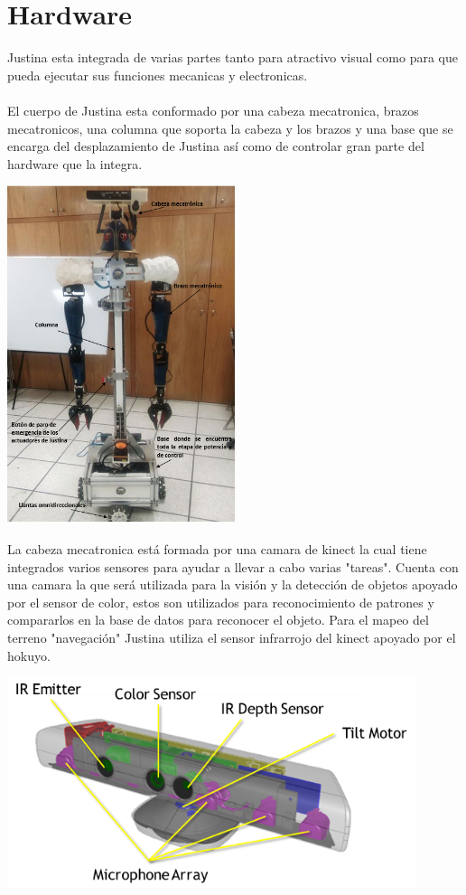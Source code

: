 \documentclass[a4paper,usenames,dvipsnames,svgnames,table]{book}
\begin{document}
\chapter{Hardware}
Justina esta integrada de varias partes tanto para atractivo visual como para que pueda ejecutar sus funciones mecanicas y 
electronicas.\\
\\
El cuerpo de Justina esta conformado por una cabeza mecatronica, brazos mecatronicos, una columna que soporta la cabeza y 
los brazos y una base que se encarga del desplazamiento de Justina así como de controlar gran parte del hardware que la 
integra.


\begin{center}
\includegraphics[width=0.5\textwidth]{Figures/Hardware/Diagramas/Cuerpo.png}
\label{fig:Hardware:Diagramas:Justina:Completa}
\end{center}
 
 La cabeza mecatronica está formada por una camara de kinect la cual tiene integrados varios sensores para ayudar a
 llevar a cabo varias "tareas". Cuenta con una camara la que será utilizada para la visión y la detección de objetos
 apoyado por el sensor de color, estos son utilizados para reconocimiento de patrones y compararlos en la base de datos
 para reconocer el objeto. Para el mapeo del terreno "navegación" Justina utiliza el sensor infrarrojo del kinect apoyado
 por el hokuyo.

\begin{center}
\includegraphics[width=0.9\textwidth]{Figures/Hardware/Partes/Kinect_sensors.png}
\label{fig:Hardware:Diagramas:Justina:Vision:Kinect}
\end{center}
\end{document}
